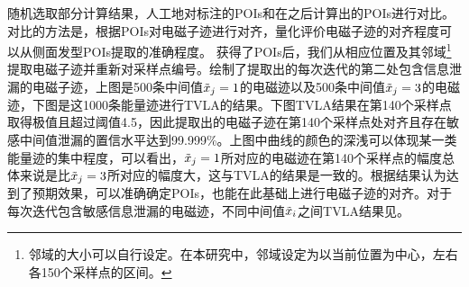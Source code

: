 {{{	%
}

	随机选取部分计算结果，人工地对标注的POIs和在\yuchuli 之后计算出的POIs进行对比。对比的方法是，根据POIs对电磁子迹进行对齐，量化评价电磁子迹的对齐程度可以从侧面发型POIs提取的准确程度。
	获得了POIs后，我们从相应位置及其邻域\footnote{邻域的大小可以自行设定。在本研究中，邻域设定为以当前位置为中心，左右各150个采样点的区间。}提取电磁子迹并重新对采样点编号。绘制了提取出的每次迭代的第二处包含信息泄漏的电磁子迹，上图是500条中间值$\tilde{x}_j=1$的电磁迹以及500条中间值$\tilde{x}_j=3$的电磁迹，下图是这1000条能量迹进行TVLA的结果。下图TVLA结果在第140个采样点取得极值且超过阈值4.5，因此提取出的电磁子迹在第140个采样点处对齐且存在敏感中间值泄漏的置信水平达到99.999\%。上图中曲线的颜色的深浅可以体现某一类能量迹的集中程度，可以看出，$\tilde{x}_j=1$所对应的电磁迹在第140个采样点的幅度总体来说是比$\tilde{x}_j=3$所对应的幅度大，这与TVLA的结果是一致的。根据结果认为\yuchuli 达到了预期效果，可以准确确定POIs，也能在此基础上进行电磁子迹的对齐。对于每次迭代包含敏感信息泄漏的电磁迹，不同中间值$\tilde{x}_i$之间TVLA结果见。
	
}}
